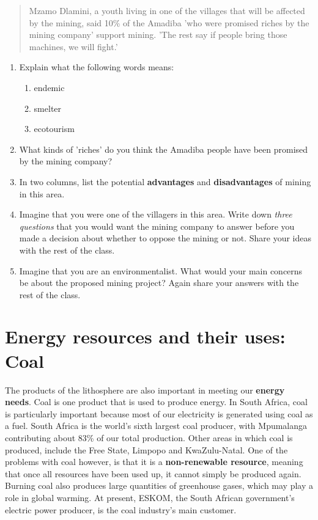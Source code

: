 {\begin{quote}
{Mzamo Dlamini, a youth living in one of the villages that will be affected by the mining, said 10\% of the Amadiba 'who were promised riches by the mining company' support mining. 'The rest say if people bring those machines, we will fight.'
}

\end{quote}

\begin{enumerate}
\item{Explain what the following words means:}
\begin{enumerate}
\item{endemic}
\item{smelter}
\item{ecotourism}
\end{enumerate}
\item{What kinds of 'riches' do you think the Amadiba people have been promised by the mining company?}
\item{In two columns, list the potential \textbf{advantages} and \textbf{disadvantages} of mining in this area.}
\item{Imagine that you were one of the villagers in this area. Write down \textit{three questions} that you would want the mining company to answer before you made a decision about whether to oppose the mining or not. Share your ideas with the rest of the class.}
\item{Imagine that you are an environmentalist. What would your main concerns be about the proposed mining project? Again share your answers with the rest of the class.}
\end{enumerate}

}







\section{Energy resources and their uses: Coal}
\label{sec:mining:energy}

The products of the lithosphere are also important in meeting our \textbf{energy needs}. Coal is one product that is used to produce energy. In South Africa, coal is particularly important because most of our electricity is generated using coal as a fuel.  South Africa is the world's sixth largest coal producer, with Mpumalanga contributing about 83\% of our total production. Other areas in which coal is produced, include the Free State, Limpopo and KwaZulu-Natal. One of the problems with coal however, is that it is a \textbf{non-renewable resource}, meaning that once all resources have been used up, it cannot simply be produced again. Burning coal also produces large quantities of greenhouse gases, which may play a role in global warming. At present, ESKOM, the South African government's electric power producer, is the coal industry's main customer.\\


